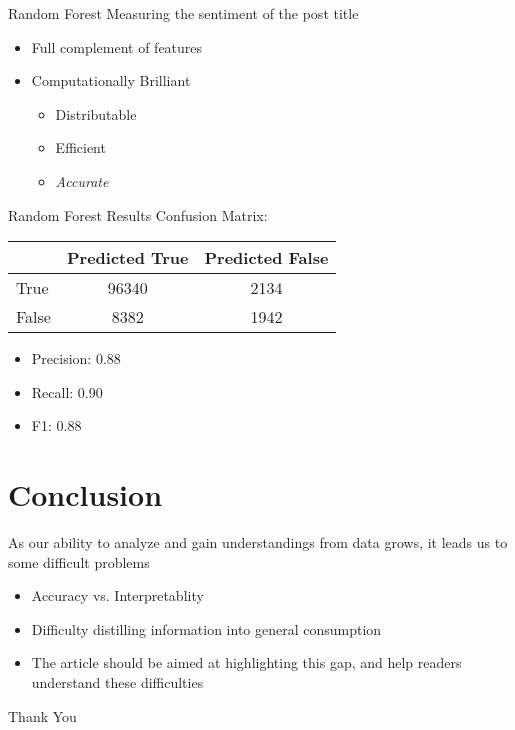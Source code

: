 \documentclass[10pt,t]{beamer}
\newcommand{\bi}{\begin{itemize}}                                 %
\newcommand{\ei}{\end{itemize}}                                   %
\begin{document}
\begin{frame}{Random Forest}
Measuring the sentiment of the post title
	\bi
		\item Full complement of features
		\item Computationally Brilliant
		\bi
			\item Distributable
			\item Efficient
			\item \textit{Accurate}
		\ei
	\ei
\end{frame}

\begin{frame}[c]{Random Forest Results}
Confusion Matrix:

\begin{table}
	\begin{tabular}{l | c | c }
		& Predicted True & Predicted False\\
		\hline \hline
		True & 96340 & 2134\\ 
		False & 8382 & 1942
	\end{tabular}
\end{table}
\bi
	\item Precision: 0.88
	\item Recall: 0.90
	\item F1: 0.88
\ei
\end{frame}

\section{Conclusion}
\begin{frame}
As our ability to analyze and gain understandings from data grows, it leads us to some difficult problems 
\bi
	\item Accuracy vs. Interpretablity
	\item Difficulty distilling information into general consumption
	\item The article should be aimed at highlighting this gap, and help readers understand these difficulties
\ei
\end{frame}

\begin{frame}[fragile, c]  %
	\begin{center}
		\Large{Thank You}
	\end{center}
\end{frame}
\end{document}

